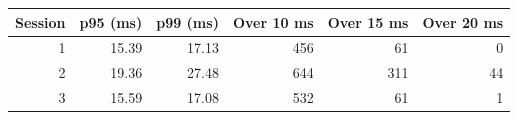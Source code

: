 \begin{tabular}{rrrrrr}
\hline
Session & p95 (ms) & p99 (ms) & Over 10 ms & Over 15 ms & Over 20 ms \\
\hline
1 & 15.39 & 17.13 & 456 & 61 & 0 \\
2 & 19.36 & 27.48 & 644 & 311 & 44 \\
3 & 15.59 & 17.08 & 532 & 61 & 1 \\
\hline
\end{tabular}
